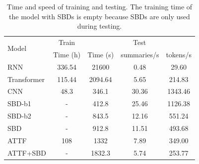 \begin{table}[th!]
\centering
\caption{Time and speed of training and testing. The training time of the model with SBDs
is empty because SBDs are only used during testing.}
\begin{tabular}{|l|c|c|c|c|}
\hline
\multirow{2}{*}{Model} & Train & \multicolumn{3}{|c|}{Test} \\
\cline{2-5}
& Time (h) & Time (s) & summaries/s & tokens/s \\
\hline
RNN  & 336.54 &21600 & 0.48 & 29.60 \\
Transformer & 115.44 & 2094.64 & 5.65 & 214.83 \\
\hline
CNN & 48.3 &346.1 & 30.36 & 1343.46 \\
SBD-b1 & - & 412.8 & 25.46 & 1126.38 \\
SBD-b2 & -  &843.5 &12.16 & 551.24 \\
SBD & - &912.8 & 11.51 & 493.68 \\
ATTF & 108 &1332 & 7.89 &  349.00 \\
ATTF+SBD & - &1832.3 & 5.74 &  253.77 \\
\hline
\end{tabular}
\label{tab:eval_speed}
\end{table}

